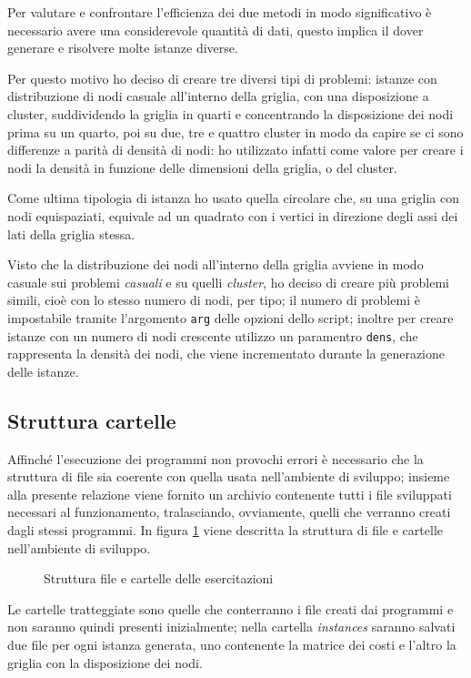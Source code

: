 Per valutare e confrontare l'efficienza dei due metodi in modo significativo è necessario avere una considerevole quantità di dati, questo implica il dover generare e risolvere molte istanze diverse.

Per questo motivo ho deciso di creare tre diversi tipi di problemi: istanze con distribuzione di nodi casuale all'interno della griglia, con una disposizione a cluster, suddividendo la griglia in quarti e concentrando la disposizione dei nodi prima su un quarto, poi su due, tre e quattro cluster in modo da capire se ci sono differenze a parità di densità di nodi: ho utilizzato infatti come valore per creare i nodi la densità in funzione delle dimensioni della griglia, o del cluster.

Come ultima tipologia di istanza ho usato quella circolare che, su una griglia con nodi equispaziati, equivale ad un quadrato con i vertici in direzione degli assi dei lati della griglia stessa.

Visto che la distribuzione dei nodi all'interno della griglia avviene in modo casuale sui problemi \emph{casuali} e su quelli \emph{cluster}, ho deciso di creare più problemi simili, cioè con lo stesso numero di nodi, per tipo; il numero di problemi è impostabile tramite l'argomento \texttt{arg} delle opzioni dello script; inoltre per creare istanze con un numero di nodi crescente utilizzo un paramentro \texttt{dens}, che rappresenta la densità dei nodi, che viene incrementato durante la generazione delle istanze.

\subsection{Struttura cartelle}
Affinché l'esecuzione dei programmi non provochi errori è necessario che la struttura di file sia coerente con quella usata nell'ambiente di sviluppo; insieme alla presente relazione viene fornito un archivio contenente tutti i file sviluppati necessari al funzionamento, tralasciando, ovviamente, quelli che verranno creati dagli stessi programmi.
In figura \ref{fig:struttura} viene descritta la struttura di file e cartelle nell'ambiente di sviluppo.

\begin{figure}[htb]
\centering

\caption{Struttura file e cartelle delle esercitazioni}
\label{fig:struttura}
\end{figure}

Le cartelle tratteggiate sono quelle che conterranno i file creati dai programmi e non saranno quindi presenti inizialmente; nella cartella \emph{instances} saranno salvati due file per ogni istanza generata, uno contenente la matrice dei costi e l'altro la griglia con la disposizione dei nodi.

